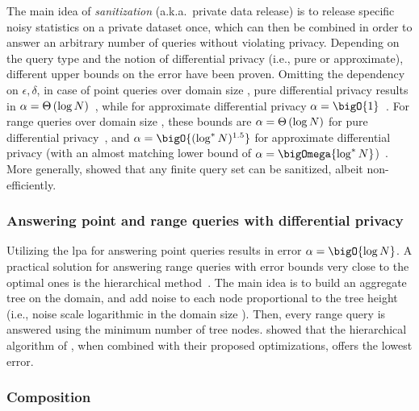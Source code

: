 		The main idea of \emph{sanitization} (a.k.a.\ private data release) is to release specific noisy statistics on a private dataset once, which can then be combined in order to answer an arbitrary number of queries without violating privacy.
		Depending on the query type and the notion of differential privacy (i.e., pure or approximate), different upper bounds on the error have been proven.
		Omitting the dependency on $\epsilon,\delta$, in case of point queries over domain size \domainSize{}, pure differential privacy results in $\alpha = \Theta \left( \log N \right)$~\cite{bounds-on-sample-complexity}, while for approximate differential privacy $\alpha = \bigO{1}$~\cite{private-learning-and-sanitization}.
		For range queries over domain size \domainSize{}, these bounds are $\alpha = \Theta \left( \log N \right)$ for pure differential privacy~\cite{non-interactive-database-privacy,dp-under-observation}, and $\alpha = \bigO{(\log^{*} \domainSize)^{1.5}}$ for approximate differential privacy (with an almost matching lower bound of $\alpha = \bigOmega{\log^{*} \domainSize}$)~\cite{private-learning-and-sanitization, dp-release, privately-learning-thresholds}.
		More generally, \textcite{non-interactive-database-privacy} showed that any finite query set \querySet{} can be sanitized, albeit non-efficiently.


		\subsubsection*{Answering point and range queries with differential privacy}

			Utilizing the \acrshort{lpa} for answering point queries results in error $\alpha = \bigO{\log \domainSize}$.
			A practical solution for answering range queries with error bounds very close to the optimal ones is the hierarchical method~\cite{dp-under-observation, accuracy-dp-histograms, dp-wavelet}.
			The main idea is to build an aggregate tree on the domain, and add noise to each node proportional to the tree height (i.e., noise scale logarithmic in the domain size \domainSize{}).
			Then, every range query is answered using the minimum number of tree nodes.
			\textcite{hierarchical-methods-for-dp} showed that the hierarchical algorithm of \textcite{accuracy-dp-histograms}, when combined with their proposed optimizations, offers the lowest error.

		\subsubsection*{Composition}

